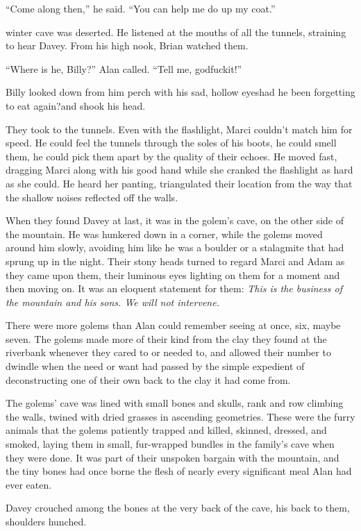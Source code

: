 ``Come along then,'' he said.  ``You can help me do up my coat.''

 winter cave was deserted.  He listened at the mouths of all the
tunnels, straining to hear Davey.  From his high nook, Brian watched
them.

``Where is he, Billy?'' Alan called.  ``Tell me, godfuckit!''

Billy looked down from him perch with his sad, hollow eyes\dash{}had he
been forgetting to eat again?\dash{}and shook his head.

They took to the tunnels.  Even with the flashlight, Marci couldn't
match him for speed.  He could feel the tunnels through the soles of
his boots, he could smell them, he could pick them apart by the
quality of their echoes.  He moved fast, dragging Marci along with his
good hand while she cranked the flashlight as hard as she could.  He
heard her panting, triangulated their location from the way that the
shallow noises reflected off the walls.

When they found Davey at last, it was in the golem's cave, on the
other side of the mountain.  He was hunkered down in a corner, while
the golems moved around him slowly, avoiding him like he was a boulder
or a stalagmite that had sprung up in the night.  Their stony heads
turned to regard Marci and Adam as they came upon them, their luminous
eyes lighting on them for a moment and then moving on.  It was an
eloquent statement for them:  \textit{This is the business of the
mountain and his sons.  We will not intervene.}

There were more golems than Alan could remember seeing at once, six,
maybe seven.  The golems made more of their kind from the clay they
found at the riverbank whenever they cared to or needed to, and
allowed their number to dwindle when the need or want had passed by
the simple expedient of deconstructing one of their own back to the
clay it had come from.

The golems' cave was lined with small bones and skulls, rank and row
climbing the walls, twined with dried grasses in ascending geometries. 
These were the furry animals that the golems patiently trapped and
killed, skinned, dressed, and smoked, laying them in small,
fur-wrapped bundles in the family's cave when they were done.  It was
part of their unspoken bargain with the mountain, and the tiny bones
had once borne the flesh of nearly every significant meal Alan had
ever eaten.

Davey crouched among the bones at the very back of the cave, his back
to them, shoulders hunched.

